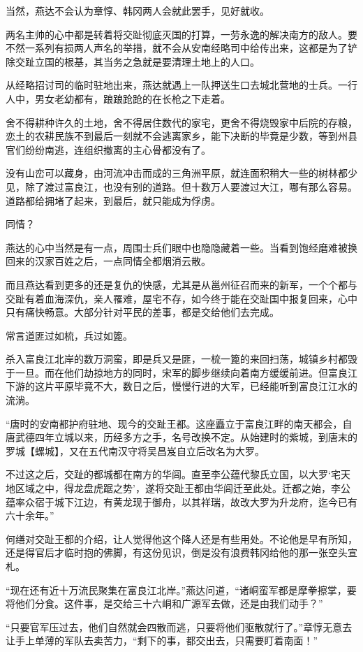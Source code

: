 当然，燕达不会认为章惇、韩冈两人会就此罢手，见好就收。

两名主帅的心中都是转着将交趾彻底灭国的打算，一劳永逸的解决南方的敌人。要不然一系列有损两人声名的举措，就不会从安南经略司中给传出来，这都是为了铲除交趾立国的根基，其当务之急就是要清理土地上的人口。

从经略招讨司的临时驻地出来，燕达就遇上一队押送生口去城北营地的士兵。一行人中，男女老幼都有，踉踉跄跄的在长枪之下走着。

舍不得耕种许久的土地，舍不得居住数代的家宅，更舍不得烧毁家中后院的存粮，恋土的农耕民族不到最后一刻就不会逃离家乡，能下决断的毕竟是少数，等到州县官们纷纷南逃，连组织撤离的主心骨都没有了。

没有山峦可以藏身，由河流冲击而成的三角洲平原，就连面积稍大一些的树林都少见，除了渡过富良江，也没有别的道路。但十数万人要渡过大江，哪有那么容易。道路都给拥堵了起来，到最后，就只能成为俘虏。

同情？

燕达的心中当然是有一点，周围士兵们眼中也隐隐藏着一些。当看到饱经磨难被换回来的汉家百姓之后，一点同情全都烟消云散。

而且燕达看到更多的还是复仇的快感，尤其是从邕州征召而来的新军，一个个都与交趾有着血海深仇，亲人罹难，屋宅不存，如今终于能在交趾国中报复回来，心中只有痛快畅意。大部分针对平民的差事，都是交给他们去完成。

常言道匪过如梳，兵过如篦。

杀入富良江北岸的数万洞蛮，即是兵又是匪，一梳一篦的来回扫荡，城镇乡村都毁于一旦。而在他们劫掠地方的同时，宋军的脚步继续向着南方缓缓前进。但富良江下游的这片平原毕竟不大，数日之后，慢慢行进的大军，已经能听到富良江江水的流淌。

“唐时的安南都护府驻地、现今的交趾王都。这座矗立于富良江畔的南天都会，自唐武德四年立城以来，历经多方之手，名号改换不定。从始建时的紫城，到唐末的罗城【螺城】，又在五代南汉守将吴昌岌自立后改名为大罗。

不过这之后，交趾的都城都在南方的华闾。直至李公蕴代黎氏立国，以大罗‘宅天地区域之中，得龙盘虎踞之势’，遂将交趾王都由华闾迁至此处。迁都之始，李公蕴率众宿于城下江边，有黄龙现于御舟，以其祥瑞，故改大罗为升龙府，迄今已有六十余年。”

何缮对交趾王都的介绍，让人觉得他这个降人还是有些用处。不论他是早有所知，还是得官后才临时抱的佛脚，有这份见识，倒是没有浪费韩冈给他的那一张空头宣札。

“现在还有近十万流民聚集在富良江北岸。”燕达问道，“诸峒蛮军都是摩拳擦掌，要将他们分食。这件事，是交给三十六峒和广源军去做，还是由我们动手？”

“只要官军压过去，他们自然就会四散而逃，只要将他们驱散就行了。”章惇无意去让手上单薄的军队去卖苦力，“剩下的事，都交出去，只需要盯着南面！”

